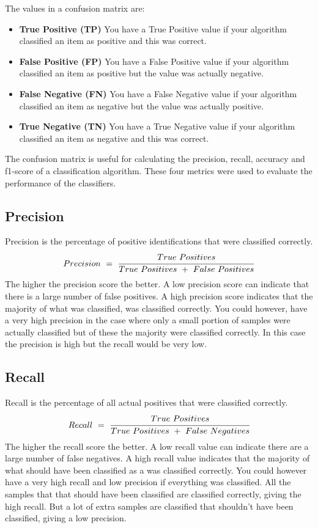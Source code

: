 The values in a confusion matrix are:
\begin{itemize}
    \item \textbf{True Positive (TP)}\newline
    You have a True Positive value if your algorithm classified an item as positive and this was correct.
    \item \textbf{False Positive (FP)}\newline
    You have a False Positive value if your algorithm classified an item as positive but the value was actually negative.
    \item \textbf{False Negative (FN)}\newline
    You have a False Negative value if your algorithm classified an item as negative but the value was actually positive.
    \item \textbf{True Negative (TN)}\newline
    You have a True Negative value if your algorithm classified an item as negative and this was correct.
\end{itemize}

The confusion matrix is useful for calculating the precision, recall, accuracy and f1-score of a classification algorithm. These four metrics were used to evaluate the performance of the classifiers.

\subsection{Precision}
Precision is the percentage of positive identifications that were classified correctly.
\begin{equation}
    Precision\ =\ \cfrac{True\ Positives}{True\ Positives\ +\ False\ Positives}
\end{equation}
The higher the precision score the better. A low precision score can indicate that there is a large number of false positives. A high precision score indicates that the majority of what was classified, was classified correctly. You could however, have a very high precision in the case where only a small portion of samples were actually classified but of these the majority were classified correctly. In this case the precision is high but the recall would be very low.

\subsection{Recall}
Recall is the percentage of all actual positives that were classified correctly.
\begin{equation}
    Recall\ =\ \cfrac{True\ Positives}{True\ Positives\ +\ False\ Negatives}
\end{equation}
The higher the recall score the better. A low recall value can indicate there are a large number of false negatives. A high recall value indicates that the majority of what should have been classified as a was classified correctly. You could however have a very high recall and low precision if everything was classified. All the samples that that should have been classified are classified correctly, giving the high recall. But a lot of extra samples are classified that shouldn't have been classified, giving a low precision.

